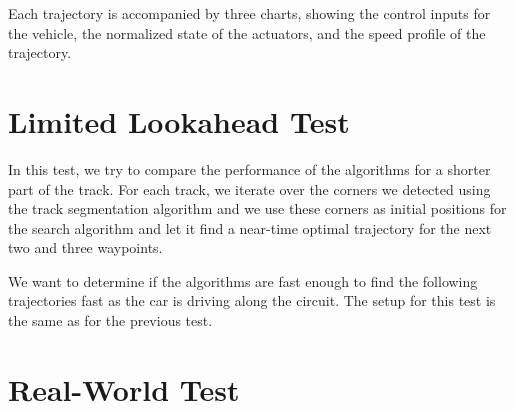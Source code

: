 Each trajectory is accompanied by three charts, showing the control inputs for the vehicle, the normalized state of the actuators, and the speed profile of the trajectory.




\section{Limited Lookahead Test}

In this test, we try to compare the performance of the algorithms for a shorter part of the track. For each track, we iterate over the corners we detected using the track segmentation algorithm and we use these corners as initial positions for the search algorithm and let it find a near-time optimal trajectory for the next two and three waypoints.

We want to determine if the algorithms are fast enough to find the following trajectories fast as the car is driving along the circuit. The setup for this test is the same as for the previous test.


\section{Real-World Test}

